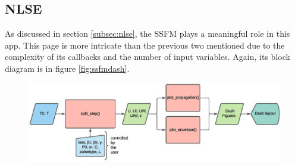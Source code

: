     \subsection{NLSE}
        As discussed in section \ref{subsec:nlse}, the SSFM plays a meaningful role in this app.  This page is more intricate than the previous two mentioned due to the complexity of its callbacks and the number of input variables. Again, its block diagram is in figure \ref{fig:ssfmdash}. 
        
        \begin{figure}[label={fig:ssfmdash}, caption={Simplified Block-Diagram of nlse.py}]
        	\includegraphics[trim = 0.5cm 12.5cm 6.5cm 0.6cm, clip, clip,width=1\textwidth]{figures/chap3/SSFM.eps} 
        \end{figure}